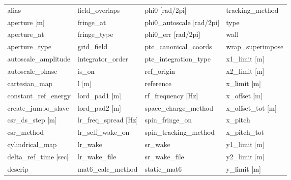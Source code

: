  \begin{tabular}{llll} \toprule
alias                            & field_overlaps                   & phi0 [rad/2pi]                   & tracking_method                  \\
aperture [m]                     & fringe_at                        & phi0_autoscale [rad/2pi]         & type                             \\
aperture_at                      & fringe_type                      & phi0_err [rad/2pi]               & wall                             \\
aperture_type                    & grid_field                       & ptc_canonical_coords             & wrap_superimpose                 \\
autoscale_amplitude              & integrator_order                 & ptc_integration_type             & x1_limit [m]                     \\
autoscale_phase                  & is_on                            & ref_origin                       & x2_limit [m]                     \\
cartesian_map                    & l [m]                            & reference                        & x_limit [m]                      \\
constant_ref_energy              & lord_pad1 [m]                    & rf_frequency [Hz]                & x_offset [m]                     \\
create_jumbo_slave               & lord_pad2 [m]                    & space_charge_method              & x_offset_tot [m]                 \\
csr_ds_step [m]                  & lr_freq_spread [Hz]              & spin_fringe_on                   & x_pitch                          \\
csr_method                       & lr_self_wake_on                  & spin_tracking_method             & x_pitch_tot                      \\
cylindrical_map                  & lr_wake                          & sr_wake                          & y1_limit [m]                     \\
delta_ref_time [sec]             & lr_wake_file                     & sr_wake_file                     & y2_limit [m]                     \\
descrip                          & mat6_calc_method                 & static_mat6                      & y_limit [m]                      \\

\end{tabular}
